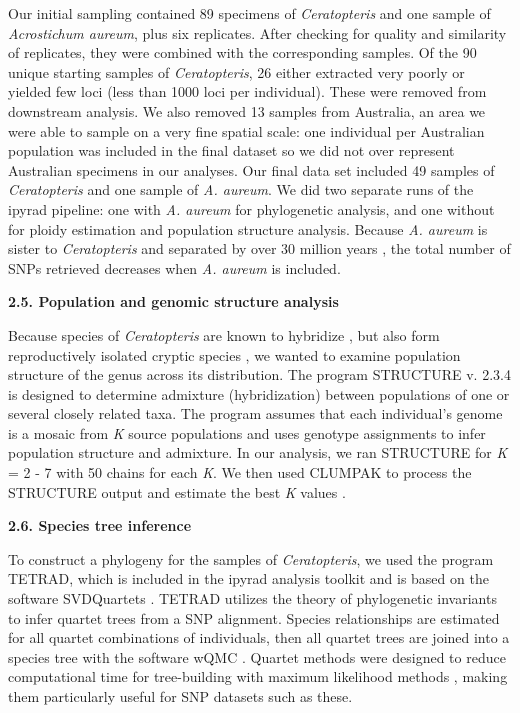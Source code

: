 \documentclass[12pt]{article}
\begin{document}
\begin{flushleft}
Our initial sampling contained 89 specimens of \textit{Ceratopteris} and one sample of \textit{Acrostichum aureum}, plus six replicates. After checking for quality and similarity of replicates, they were combined with the corresponding samples. Of the 90 unique starting samples of \textit{Ceratopteris}, 26 either extracted very poorly or yielded few loci (less than 1000 loci per individual). These were removed from downstream analysis. We also removed 13 samples from Australia, an area we were able to sample on a very fine spatial scale: one individual per Australian population was included in the final dataset so we did not over represent Australian specimens in our analyses. Our final data set included 49 samples of \textit{Ceratopteris} and one sample of \textit{A. aureum}.  We did two separate runs of the ipyrad pipeline: one with \textit{A. aureum} for phylogenetic analysis, and one without for ploidy estimation and population structure analysis. Because \textit{A. aureum} is sister to \textit{Ceratopteris} and separated by over 30 million years \autocite{PPGI}, the total number of SNPs retrieved decreases when \textit{A. aureum} is included.

\textbf{2.5. Population and genomic structure analysis}

Because species of \textit{Ceratopteris} are known to hybridize \autocite{hickok1974}, but also form reproductively isolated cryptic species \autocite{Masuyama2002}, we wanted to examine population structure of the genus across its distribution. The program {\small{STRUCTURE}} v. 2.3.4 \autocite{Pritchard2000} is designed to determine admixture (hybridization) between populations of one or several closely related taxa. The program assumes that each individual's genome is a mosaic from \textit{K} source populations and uses genotype assignments to infer population structure and admixture. In our analysis, we ran {\small{STRUCTURE}} for \textit{K} = 2 - 7 with 50 chains for each \textit{K}. We then used {\small{CLUMPAK}} \autocite{Kopelman2015} to process the {\small{STRUCTURE}} output and estimate the best \textit{K} values \autocite{Evanno2005, Pritchard2000}.

\textbf{2.6. Species tree inference}

To construct a phylogeny for the samples of \textit{Ceratopteris}, we used the program {\small{TETRAD}}, which is included in the ipyrad analysis toolkit and is based on the software \small{SVDQuartets} \autocite{Chifman2015}. {\small{TETRAD}} utilizes the theory of phylogenetic invariants to infer quartet trees from a SNP alignment. Species relationships are estimated for all quartet combinations of individuals, then all quartet trees are joined into a species tree with the software {\small{wQMC}} \autocite{Avni2015}. Quartet methods were designed to reduce computational time for tree-building with maximum likelihood methods \autocite{Ranwez2001}, making them particularly useful for SNP datasets such as these.


\end{flushleft}
\end{document}
